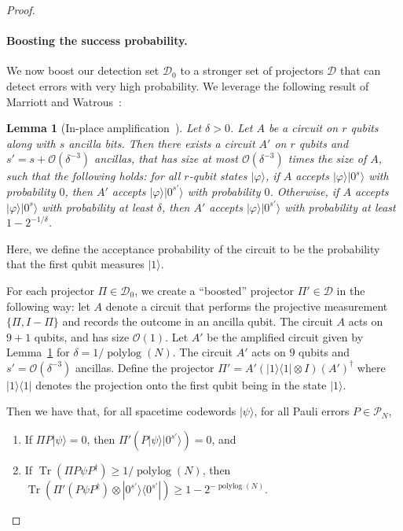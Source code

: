 \documentclass[11pt,letterpaper]{article}
\newtheorem{lemma}[theorem]{Lemma}
\theoremstyle{definition}
\theoremstyle{remark}
\DeclareMathOperator{\Tr}{Tr}
\DeclareMathOperator{\polylog}{polylog}
\newcommand{\cD}{\mathcal D}
\newcommand{\cP}{\mathcal P}
\renewcommand{\geq}{\geqslant}
\numberwithin{equation}{section}
\let\origparagraph\paragraph
\renewcommand{\paragraph}[1]{\origparagraph{#1.}}
\theoremstyle{definition}
\newcommand{\ket}[1]{|#1\rangle}
\newcommand{\ketbra}[2]{|#1\rangle\! \langle #2|}
\begin{document}
\begin{proof}
%
  
  \paragraph{Boosting the success probability} We now boost our detection set $\cD_0$ to a stronger set of projectors $\cD$ that can detect errors with very high probability. We leverage the following result of Marriott and Watrous~\cite{marriott2005quantum}:
  
  \begin{lemma}[In-place amplification~\cite{marriott2005quantum}]
  \label{lem:mw}
  Let $\delta > 0 $. Let $A$ be a circuit on $r$ qubits along with $s$ ancilla bits. Then there exists a circuit $A'$ on $r$ qubits and $s' = s + \mathcal{O}(\delta^{-3})$ ancillas, that has size at most $\mathcal{O}(\delta^{-3})$ times the size of $A$, such that the following holds: for all $r$-qubit states $\ket{\varphi}$, if $A$ accepts $\ket{\varphi} \ket{0^s}$ with probability $0$, then $A'$ accepts $\ket{\varphi} \ket{0^{s'}}$ with probability $0$. Otherwise, if $A$ accepts $\ket{\varphi} \ket{0^s}$ with probability at least $\delta$, then $A'$ accepts $\ket{\varphi} \ket{0^{s'}}$ with probability at least $1 - 2^{-1/\delta}$.  
%
%
%
%
%
%
%
%
%
%
  \end{lemma}
  Here, we define the acceptance probability of the circuit to be the probability that the first qubit measures $\ket{1}$.
  
  For each projector $\Pi \in \cD_0$, we create a ``boosted'' projector $\Pi' \in \cD$ in the following way: let $A$ denote a circuit that performs the projective measurement $\{ \Pi, I - \Pi \}$ and records the outcome in an ancilla qubit. The circuit $A$ acts on $9 + 1$ qubits, and has size $\mathcal{O}(1)$. Let $A'$ be the amplified circuit given by Lemma~\ref{lem:mw} for $\delta = 1/\polylog(N)$. The circuit $A'$ acts on $9$ qubits and $s' = \mathcal{O}(\delta^{-3})$ ancillas. Define the projector $\Pi' = A' (\ketbra{1}{1} \otimes I) (A')^\dagger$ where $\ketbra{1}{1}$ denotes the projection onto the first qubit being in the state $\ket{1}$. 

  Then we have that, for all spacetime codewords $\ket{\psi}$, for all Pauli errors $P \in \cP_N$,
  \begin{enumerate}
    \item If $\Pi P \ket{\psi} = 0$, then $\Pi' (P \ket{\psi} \ket{0^{s'}}) = 0$, and
    \item If $\Tr( \Pi P \psi P^\dagger) \geq 1/\polylog(N)$, then $\Tr( \Pi' (P \psi P^\dagger) \otimes \ketbra{0^{s'}}{0^{s'}}) \geq 1 - 2^{-\polylog(N)}$.
  \end{enumerate} 
  

\end{proof}
\end{document}

